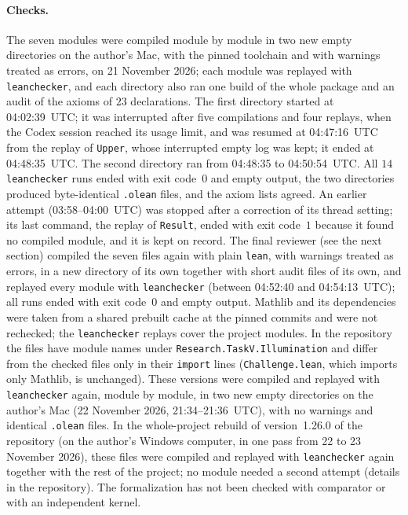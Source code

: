 \documentclass[11pt]{article}
\theoremstyle{definition}
\theoremstyle{remark}
\newcommand{\repoversion}{1.26.0}
\begin{document}
{\paragraph{Checks.} The seven modules were compiled module by module in two
new empty directories on the author's Mac, with the pinned toolchain and with
warnings treated as errors, on 21 November 2026; each module was replayed with
\texttt{leanchecker}, and each directory also ran one build of the whole
package and an audit of the axioms of $23$ declarations. The first directory
started at 04:02:39~UTC; it was interrupted after five compilations and four
replays, when the Codex session reached its usage limit, and was resumed at
04:47:16~UTC from the replay of \texttt{Upper}, whose interrupted empty log was
kept; it ended at 04:48:35~UTC. The second directory ran from 04:48:35 to
04:50:54~UTC. All $14$ \texttt{leanchecker} runs ended with exit code~$0$ and
empty output, the two directories produced byte-identical \texttt{.olean}
files, and the axiom lists agreed. An earlier attempt (03:58--04:00~UTC) was
stopped after a correction of its thread setting; its last command, the
replay of \texttt{Result}, ended with exit code~$1$ because it found no
compiled module, and it is kept on record. The final reviewer (see the next
section) compiled the seven files again with plain \texttt{lean}, with
warnings treated as errors, in a new directory of its own together with short
audit files of its own, and replayed every module with \texttt{leanchecker}
(between 04:52:40 and 04:54:13~UTC); all runs ended with exit code~$0$ and
empty output. Mathlib and its dependencies were taken from a shared prebuilt
cache at the pinned commits and were not rechecked; the \texttt{leanchecker}
replays cover the project modules. In the repository the files have module
names under \texttt{Research.TaskV.Illumination} and differ from the checked
files only in their \texttt{import} lines (\texttt{Challenge.lean}, which
imports only Mathlib, is unchanged).
These versions were compiled and replayed with \texttt{leanchecker} again, module by module, in two new empty directories on the author's Mac (22 November 2026, 21:34--21:36~UTC), with no warnings and identical \texttt{.olean} files.
In the whole-project rebuild of version~\repoversion{} of the repository (on the author's Windows computer, in one pass from 22 to 23 November 2026), these files were compiled and replayed with \texttt{leanchecker} again together with the rest of the project; no module needed a second attempt (details in the repository). The formalization has not been checked with comparator or with
an independent kernel.

\par}
\end{document}
